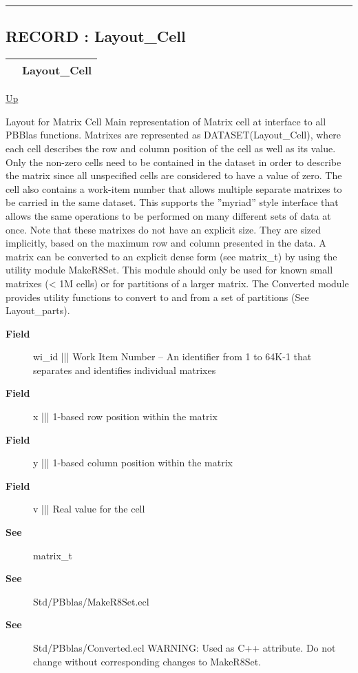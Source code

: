 \rule{\textwidth}{0.4pt}
\subsection*{RECORD : Layout\_Cell}
\hypertarget{ecldoc:pbblas.types.layout_cell}{}

{\renewcommand{\arraystretch}{1.5}
\begin{tabularx}{\textwidth}{|>{\raggedright\arraybackslash}l|X|}
\hline
\hspace{0pt} & Layout\_Cell \\
\hline
\end{tabularx}
}

\hyperlink{ecldoc:PBblas.Types}{Up}

\par
Layout for Matrix Cell Main representation of Matrix cell at interface to all PBBlas functions. Matrixes are represented as DATASET(Layout\_Cell), where each cell describes the row and column position of the cell as well as its value. Only the non-zero cells need to be contained in the dataset in order to describe the matrix since all unspecified cells are considered to have a value of zero. The cell also contains a work-item number that allows multiple separate matrixes to be carried in the same dataset. This supports the ''myriad'' style interface that allows the same operations to be performed on many different sets of data at once. Note that these matrixes do not have an explicit size. They are sized implicitly, based on the maximum row and column presented in the data. A matrix can be converted to an explicit dense form (see matrix\_t) by using the utility module MakeR8Set. This module should only be used for known small matrixes (< 1M cells) or for partitions of a larger matrix. The Converted module provides utility functions to convert to and from a set of partitions (See Layout\_parts).

\par
\begin{description}
\item [\textbf{Field}] wi\_id ||| Work Item Number -- An identifier from 1 to 64K-1 that separates and identifies individual matrixes
\item [\textbf{Field}] x ||| 1-based row position within the matrix
\item [\textbf{Field}] y ||| 1-based column position within the matrix
\item [\textbf{Field}] v ||| Real value for the cell
\item [\textbf{See}] matrix\_t
\item [\textbf{See}] Std/PBblas/MakeR8Set.ecl
\item [\textbf{See}] Std/PBblas/Converted.ecl WARNING: Used as C++ attribute. Do not change without corresponding changes to MakeR8Set.
\end{description}

